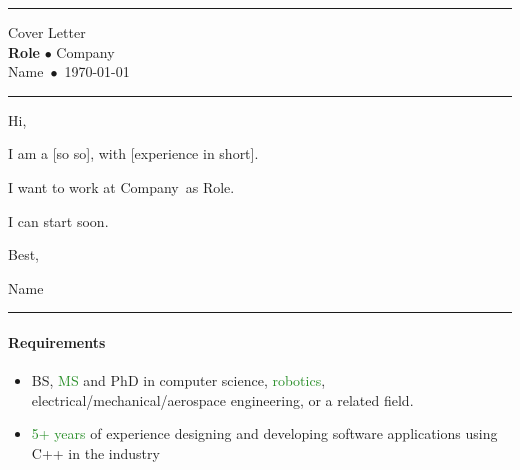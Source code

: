 \documentclass[11pt, a4paper]{article}
\newcommand{\green}[1]{\textcolor{ForestGreen}{#1}}
\newcommand{\tick}{\green{\faCheckCircle}}
\newcommand{\name}{Blank}
\newcommand{\role}{Role}
\newcommand{\company}{Company}
\newcommand{\coverletterheader}{\hrule
    \begin{center}
        \large Cover Letter\\
        \Large\textbf{\role} $\bullet$ \company\\
        \large\name~$\bullet$~\today\\
        \normalsize
    \end{center}
    \hrule\bigskip
}
\newenvironment{skills}[1]{\paragraph{\textsf{#1}}\begin{itemize}\setlength\itemsep{0em}}{\end{itemize}}
\renewcommand{\name}{Name}
\renewcommand{\role}{Role}
\renewcommand{\company}{Company}
\begin{document}
\selectfont

\thispagestyle{empty}

\coverletterheader

\noindent Hi,

\medskip

I am a [so so], with [experience in short].

\medskip

I want to work at \company~as \role.

\medskip

I can start soon.

\medskip

\noindent Best,

\noindent \name

\vfill

\hrule

\begin{skills}{Requirements}
    \item[\tick] BS, \green{MS} and PhD in computer science, \green{robotics}, electrical/mechanical/aerospace engineering, or a related field.
    \item \green{5+ years} of experience designing and developing software applications using C++ in the industry
\end{skills}
\end{document}
